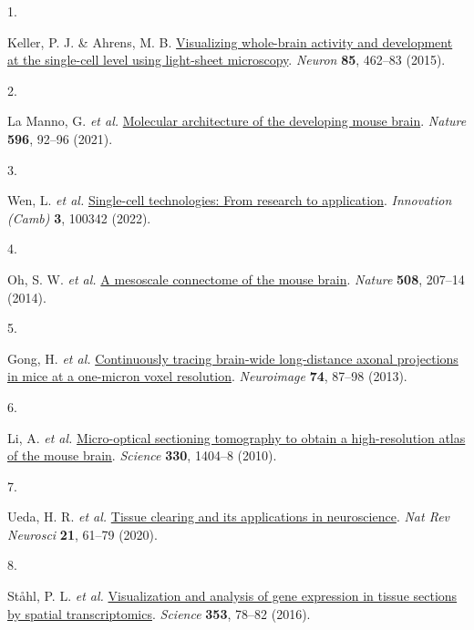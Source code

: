 \documentclass[
  12pt,
]{article}
\newlength{\cslhangindent}
\newlength{\csllabelwidth}
\newenvironment{CSLReferences}[2] %
 {\begin{list}{}{%
  \setlength{\itemindent}{0pt}
  \setlength{\leftmargin}{0pt}
  \setlength{\parsep}{0pt}
  \ifodd #1
   \setlength{\leftmargin}{\cslhangindent}
   \setlength{\itemindent}{-1\cslhangindent}
  \fi
  \setlength{\itemsep}{#2\baselineskip}}}
 {\end{list}}
\newcommand{\CSLLeftMargin}[1]{\parbox[t]{\csllabelwidth}{\strut#1\strut}}
\newcommand{\CSLRightInline}[1]{\parbox[t]{\linewidth - \csllabelwidth}{\strut#1\strut}}
\begin{document}
\label{refs}
\begin{CSLReferences}{0}{0}
\CSLLeftMargin{1. }%
\CSLRightInline{Keller, P. J. \& Ahrens, M. B.
\href{https://doi.org/10.1016/j.neuron.2014.12.039}{Visualizing
whole-brain activity and development at the single-cell level using
light-sheet microscopy}. \emph{Neuron} \textbf{85}, 462--83 (2015).}

\CSLLeftMargin{2. }%
\CSLRightInline{La Manno, G. \emph{et al.}
\href{https://doi.org/10.1038/s41586-021-03775-x}{Molecular architecture
of the developing mouse brain}. \emph{Nature} \textbf{596}, 92--96
(2021).}

\CSLLeftMargin{3. }%
\CSLRightInline{Wen, L. \emph{et al.}
\href{https://doi.org/10.1016/j.xinn.2022.100342}{Single-cell
technologies: From research to application}. \emph{Innovation (Camb)}
\textbf{3}, 100342 (2022).}

\CSLLeftMargin{4. }%
\CSLRightInline{Oh, S. W. \emph{et al.}
\href{https://doi.org/10.1038/nature13186}{A mesoscale connectome of the
mouse brain}. \emph{Nature} \textbf{508}, 207--14 (2014).}

\CSLLeftMargin{5. }%
\CSLRightInline{Gong, H. \emph{et al.}
\href{https://doi.org/10.1016/j.neuroimage.2013.02.005}{Continuously
tracing brain-wide long-distance axonal projections in mice at a
one-micron voxel resolution}. \emph{Neuroimage} \textbf{74}, 87--98
(2013).}

\CSLLeftMargin{6. }%
\CSLRightInline{Li, A. \emph{et al.}
\href{https://doi.org/10.1126/science.1191776}{Micro-optical sectioning
tomography to obtain a high-resolution atlas of the mouse brain}.
\emph{Science} \textbf{330}, 1404--8 (2010).}

\CSLLeftMargin{7. }%
\CSLRightInline{Ueda, H. R. \emph{et al.}
\href{https://doi.org/10.1038/s41583-019-0250-1}{Tissue clearing and its
applications in neuroscience}. \emph{Nat Rev Neurosci} \textbf{21},
61--79 (2020).}

\CSLLeftMargin{8. }%
\CSLRightInline{Ståhl, P. L. \emph{et al.}
\href{https://doi.org/10.1126/science.aaf2403}{Visualization and
analysis of gene expression in tissue sections by spatial
transcriptomics}. \emph{Science} \textbf{353}, 78--82 (2016).}


\end{CSLReferences}
\end{document}
